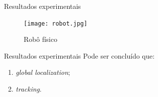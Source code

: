 \begin{frame}[c]{Resultados experimentais}
    \begin{figure}
        \texttt{[image: robot.jpg]}
       
          
        \caption{Robô físico\cite{article}}
    \end{figure}
\end{frame}

\begin{frame}[c]{Resultados experimentais}
Pode ser concluído que:
    \begin{enumerate}
        \item \textit{global localization};
        \item \textit{tracking}.
    \end{enumerate}

\end{frame}